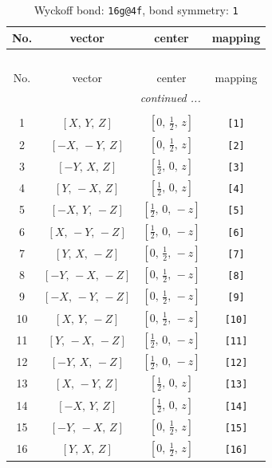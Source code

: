 \documentclass[fleqn,8pt]{jsarticle}
\begin{document}
\begin{longtable}{cccc}
\caption{Wyckoff bond: {\tt 16g@4f}, bond symmetry: {\tt 1}}
 \\
 \hline \hline
No. & vector & center & mapping \\ \hline \endfirsthead

\multicolumn{3}{l}{\tablename\ \thetable{}} \\
 \hline \hline
No. & vector & center & mapping \\ \hline \endhead

 \hline \hline
\multicolumn{3}{r}{\footnotesize\it continued ...} \\ \endfoot

 \hline \hline
\multicolumn{3}{r}{} \\ \endlastfoot

1 & $\left[ X,\, Y,\, Z \right]$ & $\left[ 0,\, \frac{1}{2},\, z \right]$ & {\tt [1]} \\ \hline
2 & $\left[ - X,\, - Y,\, Z \right]$ & $\left[ 0,\, \frac{1}{2},\, z \right]$ & {\tt [2]} \\ \hline
3 & $\left[ - Y,\, X,\, Z \right]$ & $\left[ \frac{1}{2},\, 0,\, z \right]$ & {\tt [3]} \\ \hline
4 & $\left[ Y,\, - X,\, Z \right]$ & $\left[ \frac{1}{2},\, 0,\, z \right]$ & {\tt [4]} \\ \hline
5 & $\left[ - X,\, Y,\, - Z \right]$ & $\left[ \frac{1}{2},\, 0,\, - z \right]$ & {\tt [5]} \\ \hline
6 & $\left[ X,\, - Y,\, - Z \right]$ & $\left[ \frac{1}{2},\, 0,\, - z \right]$ & {\tt [6]} \\ \hline
7 & $\left[ Y,\, X,\, - Z \right]$ & $\left[ 0,\, \frac{1}{2},\, - z \right]$ & {\tt [7]} \\ \hline
8 & $\left[ - Y,\, - X,\, - Z \right]$ & $\left[ 0,\, \frac{1}{2},\, - z \right]$ & {\tt [8]} \\ \hline
9 & $\left[ - X,\, - Y,\, - Z \right]$ & $\left[ 0,\, \frac{1}{2},\, - z \right]$ & {\tt [9]} \\ \hline
10 & $\left[ X,\, Y,\, - Z \right]$ & $\left[ 0,\, \frac{1}{2},\, - z \right]$ & {\tt [10]} \\ \hline
11 & $\left[ Y,\, - X,\, - Z \right]$ & $\left[ \frac{1}{2},\, 0,\, - z \right]$ & {\tt [11]} \\ \hline
12 & $\left[ - Y,\, X,\, - Z \right]$ & $\left[ \frac{1}{2},\, 0,\, - z \right]$ & {\tt [12]} \\ \hline
13 & $\left[ X,\, - Y,\, Z \right]$ & $\left[ \frac{1}{2},\, 0,\, z \right]$ & {\tt [13]} \\ \hline
14 & $\left[ - X,\, Y,\, Z \right]$ & $\left[ \frac{1}{2},\, 0,\, z \right]$ & {\tt [14]} \\ \hline
15 & $\left[ - Y,\, - X,\, Z \right]$ & $\left[ 0,\, \frac{1}{2},\, z \right]$ & {\tt [15]} \\ \hline
16 & $\left[ Y,\, X,\, Z \right]$ & $\left[ 0,\, \frac{1}{2},\, z \right]$ & {\tt [16]} \\
\end{longtable}
\end{document}
